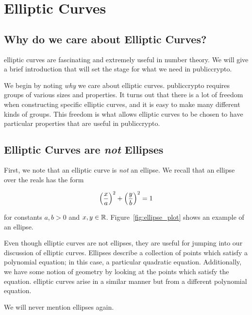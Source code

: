 \section{Elliptic Curves}
\label{sec:math_elliptic_curves}

\subsection{Why do we care about Elliptic Curves?}

\Glspl{elliptic curve} are fascinating and extremely useful in
\gls{number theory}.
We will give a brief introduction that will set the stage
for what we need in \gls{publiccrypto}.

We begin by noting \emph{why} we care about \glspl{elliptic curve}.
\Gls{publiccrypto} requires \glspl{group}
of various sizes and properties.
It turns out that there is a lot of freedom when constructing
specific \glspl{elliptic curve},
and it is easy to make many different kinds of \glspl{group}.
This freedom is what allows \glspl{elliptic curve} to be chosen
to have particular properties that are useful in \gls{publiccrypto}.

\subsection{Elliptic Curves are \emph{not} Ellipses}

First, we note that an \gls{elliptic curve} is \emph{not} an ellipse.
We recall that an ellipse over the reals has the form

\begin{equation}
    \left( \frac{x}{a} \right)^{2} + \left( \frac{y}{b} \right)^{2} = 1
\end{equation}

\noindent
for constants $a,b>0$ and $x,y\in\mathbb{R}$.
Figure~\ref{fig:ellipse_plot} shows an example of an ellipse.



Even though \glspl{elliptic curve} are not ellipses,
they are useful for jumping into our discussion of \glspl{elliptic curve}.
Ellipses describe a collection of points which satisfy a polynomial equation;
in this case, a particular quadratic equation.
Additionally, we have some notion of geometry by looking
at the points which satisfy the equation.
\Glspl{elliptic curve} arise in a similar manner but from a different polynomial
equation.

We will never mention ellipses again.

